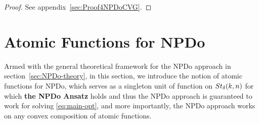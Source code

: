 \documentclass[11pt]{article}
\def\scrH{\mathscr{H}}
\def\scrR{\mathscr{R}}
\def\cR{{\cal R}}
\newcommand\STMnbr{{\rm St}_{\delta}(k,n)}
\DeclareMathOperator*{\opt}{opt}
\DeclareMathOperator{\T}{T}
\def\scrR{\mathscr{R}}
\theoremstyle{definition}
\numberwithin{equation}{section}
\begin{document}
\begin{proof}
See appendix~\ref{sec:Proof4NPDoCVG}.
\end{proof}





\section{Atomic Functions for NPDo}\label{sec:AF-NPD}

Armed with the general theoretical framework for the NPDo approach in
section~\ref{sec:NPDo-theory},
in this section, we introduce the notion of atomic functions for NPDo, which serves as
a singleton unit of function on $\STMnbr$
for which {\bf the NPDo Ansatz} holds and thus the NPDo approach is guaranteed to work  for solving \eqref{eq:main-opt}, and more importantly,
the NPDo approach works on any convex composition of atomic functions.
\end{document}
